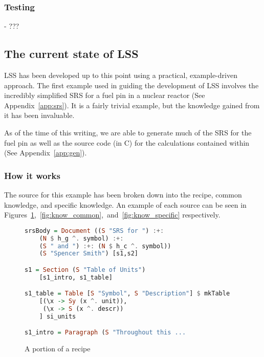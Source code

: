 \documentclass{sig-alternate-05-2015}
\newcommand{\lss}{LSS}
\begin{document}


\subsubsection{Testing} \label{sssec:adv_test}%

- ???

\subsection{The current state of \lss} \label{ssec:example}

\lss{} has been developed up to this point using a practical, example-driven
approach. The first example used in guiding the development of \lss{} involves
the incredibly simplified SRS for a fuel pin in a nuclear reactor (See
Appendix~\ref{app:srs}). It is a fairly trivial example, but the knowledge
gained from it has been invaluable.

As of the time of this writing, we are able to generate much of the SRS for the
fuel pin as well as the source code (in C) for the calculations contained within
(See Appendix~\ref{app:gen}).

\subsubsection{How it works} \label{sssec:ex_how}

The source for this example has been broken down into the recipe, common
knowledge, and specific knowledge.  An example of each source can be seen in
Figures~\ref{fig:recipe},~\ref{fig:know_common},~and~\ref{fig:know_specific}
respectively.

\begin{figure}
\begin{lstlisting}[language=Haskell, frame=single, showstringspaces=false, basicstyle=\tiny]
srsBody = Document ((S "SRS for ") :+: 
    (N $ h_g ^. symbol) :+: 
    (S " and ") :+: (N $ h_c ^. symbol)) 
    (S "Spencer Smith") [s1,s2]

s1 = Section (S "Table of Units") 
    [s1_intro, s1_table]

s1_table = Table [S "Symbol", S "Description"] $ mkTable
    [(\x -> Sy (x ^. unit)),
     (\x -> S (x ^. descr))
    ] si_units

s1_intro = Paragraph (S "Throughout this ...
\end{lstlisting}
\caption{A portion of a recipe}
\label{fig:recipe}
\end{figure}
\end{document}
